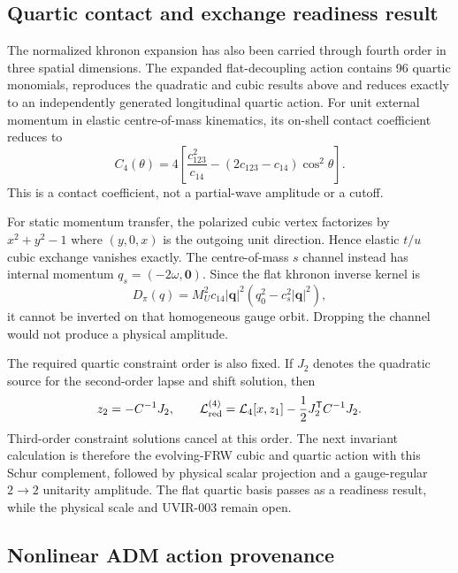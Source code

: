 \subsection{Quartic contact and exchange readiness result}

The normalized khronon expansion has also been carried through fourth order in
three spatial dimensions.  The expanded flat-decoupling action contains 96
quartic monomials, reproduces the quadratic and cubic results above and reduces
exactly to an independently generated longitudinal quartic action.  For unit
external momentum in elastic centre-of-mass kinematics, its on-shell contact
coefficient reduces to
\begin{equation}
 C_4(\theta)=4\left[\frac{c_{123}^2}{c_{14}}
 -(2c_{123}-c_{14})\cos^2\theta\right].
 \label{eq:khronon-quartic-contact}
\end{equation}
This is a contact coefficient, not a partial-wave amplitude or a cutoff.

For static momentum transfer, the polarized cubic vertex factorizes by
$x^2+y^2-1$ where $(y,0,x)$ is the outgoing unit direction.  Hence elastic
$t/u$ cubic exchange vanishes exactly.  The centre-of-mass $s$ channel instead
has internal momentum $q_s=(-2\omega,\mathbf 0)$.  Since the flat khronon
inverse kernel is
\begin{equation}
 D_\pi(q)=M_U^2c_{14}|\mathbf q|^2
 \left(q_0^2-c_s^2|\mathbf q|^2\right),
 \label{eq:khronon-flat-kernel}
\end{equation}
it cannot be inverted on that homogeneous gauge orbit.  Dropping the channel
would not produce a physical amplitude.

The required quartic constraint order is also fixed.  If $J_2$ denotes the
quadratic source for the second-order lapse and shift solution, then
\begin{equation}
 z_2=-C^{-1}J_2,\qquad
 \mathcal L_{\rm red}^{(4)}=\mathcal L_4[x,z_1]
 -\frac12J_2^{\mathsf T}C^{-1}J_2.
 \label{eq:quartic-constraint-schur}
\end{equation}
Third-order constraint solutions cancel at this order.  The next invariant
calculation is therefore the evolving-FRW cubic and quartic action with this
Schur complement, followed by physical scalar projection and a gauge-regular
$2\!\to\!2$ unitarity amplitude.  The flat quartic basis passes as a readiness
result, while the physical scale and UVIR-003 remain open.

\subsection{Nonlinear ADM action provenance}

